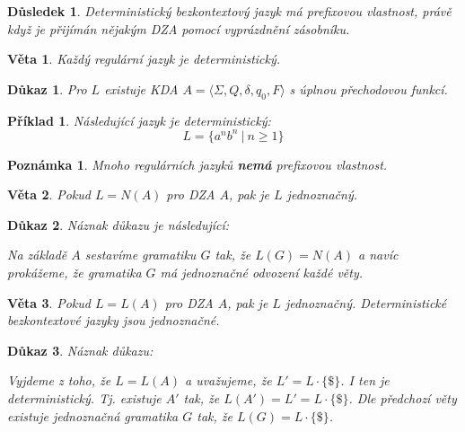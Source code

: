 \documentclass[10pt, a4paper, titlepage]{article}
\theoremstyle{note}
\newtheorem{veta}{Věta}
\newtheorem{dukaz}{Důkaz}
\newtheorem{priklad}{Příklad}
\newtheorem{poznamka}{Poznámka}
\newtheorem{dusledek}{Důsledek}
\begin{document}
\begin{dusledek}
Deterministický bezkontextový jazyk má prefixovou vlastnost, právě když je přijímán nějakým DZA pomocí vyprázdnění zásobníku.
\end{dusledek}

\begin{veta}
Každý regulární jazyk je deterministický.
\end{veta}

\begin{dukaz}
Pro $L$ existuje KDA $A = \langle \Sigma,Q,\delta,q_0,F \rangle$ s úplnou přechodovou funkcí.
\end{dukaz}

\begin{priklad}
Následující jazyk je deterministický:
$$
L = \lbrace a^nb^n\ |\ n\ge1 \rbrace
$$
\end{priklad}

\begin{poznamka}
Mnoho regulárních jazyků \textbf{nemá} prefixovou vlastnost.
\end{poznamka}

\begin{veta}
Pokud $L=N(A)$ pro DZA $A$, pak je $L$ jednoznačný.
\end{veta}

\begin{dukaz}
Náznak důkazu je následující:

Na základě $A$ sestavíme gramatiku $G$ tak, že $L(G) = N(A)$ a navíc prokážeme, že gramatika $G$ má jednoznačné odvození každé věty.
\end{dukaz}

\begin{veta}
Pokud $L=L(A)$ pro DZA $A$, pak je $L$ jednoznačný. Deterministické bezkontextové jazyky jsou jednoznačné.
\end{veta}

\begin{dukaz}
Náznak důkazu:

Vyjdeme z toho, že $L=L(A)$ a uvažujeme, že $L'=L \cdot \lbrace \$ \rbrace$. I ten je deterministický. Tj. existuje $A'$ tak, že $L(A')=L'=L \cdot \lbrace \$ \rbrace$. Dle předchozí věty existuje jednoznačná gramatika $G$ tak, že $L(G) = L \cdot \lbrace \$ \rbrace$.
\end{dukaz}
\end{document}
